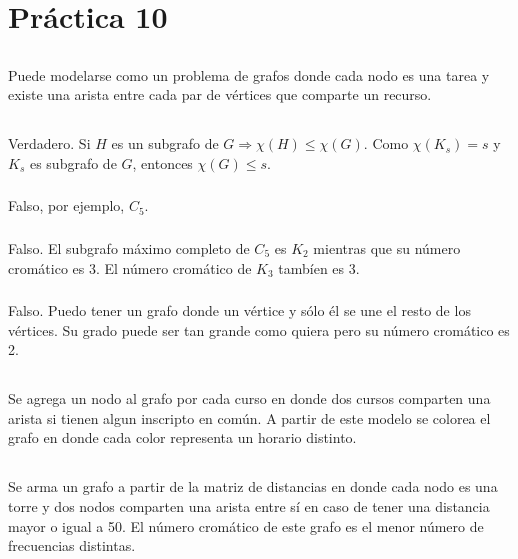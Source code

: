 \section{Práctica 10}

\setcounter{subsection}{1}
\subsection{}
Puede modelarse como un problema de grafos donde cada nodo es una tarea y existe una arista entre cada par de vértices que comparte un recurso.

\subsection{}
\subsubsection{}
Verdadero. Si $H$ es un subgrafo de $G \Longrightarrow \chi(H) \leq \chi(G)$. Como $\chi(K_s) = s$ y $K_s$ es subgrafo de $G$, entonces $\chi(G) \leq s$.

\subsubsection{}
Falso, por ejemplo, $C_5$.

\subsubsection{}
Falso. El subgrafo máximo completo de $C_5$ es $K_2$ mientras que su número cromático es 3. El número cromático de $K_3$ tambíen es 3.

\subsubsection{}
Falso. Puedo tener un grafo donde un vértice y sólo él se une el resto de los vértices. Su grado puede ser tan grande como quiera pero su número cromático es 2.

\subsection{}
Se agrega un nodo al grafo por cada curso en donde dos cursos comparten una arista si tienen algun inscripto en común. A partir de este modelo se colorea el grafo en donde cada color representa un horario distinto.

\subsection{}
Se arma un grafo a partir de la matriz de distancias en donde cada nodo es una torre y dos nodos comparten una arista entre sí en caso de tener una distancia mayor o igual a 50. El número cromático de este grafo es el menor número de frecuencias distintas.

